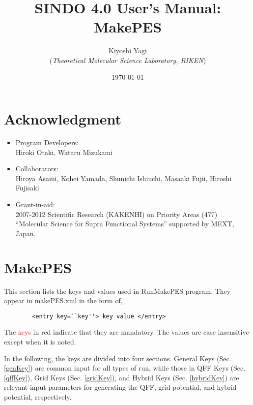 \documentclass[a4paper,12pt]{article}
\title{{\huge S{\LARGE INDO} 4.0 User's Manual: MakePES} }
\author{Kiyoshi Yagi \\ ({\it Theoretical Molecular Science Laboratory, RIKEN})}
\date{\today}
\begin{document}
\maketitle

\newpage
\tableofcontents

\newpage

\section*{Acknowledgment}

\begin{itemize}
  \item Program Developers: \\
	Hiroki Otaki, Wataru Mizukami

  \item Collaborators: \\
	Hiroya Asami, Kohei Yamada, Shunichi Ishiuchi, Masaaki Fujii, Hiroshi Fujisaki

  \item Grant-in-aid: \\
	2007-2012 Scientific Research (KAKENHI) on Priority Areas (477)  ``Molecular Science for Supra Functional Systems'' supported by MEXT, Japan.	
  
\end{itemize}

\newpage

\section{MakePES}
This section lists the keys and values used in RunMakePES program. They appear in makePES.xml in the form of, 
\begin{verbatim}        <entry key=``key''> key value </entry> \end{verbatim} 
The \textcolor{red}{keys} in red indicate that they are mandatory. The values are case insensitive except when it 
is noted.

In the following, the keys are divided into four sections. General Keys (Sec. \ref{genKey}) are common input for 
all types of run, while those in QFF Keys (Sec. \ref{qffKey}), Grid Keys (Sec. \ref{gridKey}), and Hybrid Keys 
(Sec. \ref{hybridKey}) are relevant input parameters for generating the QFF, grid potential, and hybrid potential, 
respectively.
\end{document}
